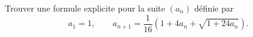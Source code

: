 Trouver une formule explicite pour la suite $(a_n)$ définie par
\[ a_1 = 1,\qquad a_{n+1} = \frac{1}{16}\left(1 + 4a_n + \sqrt{1 + 24a_n}\right). \]
